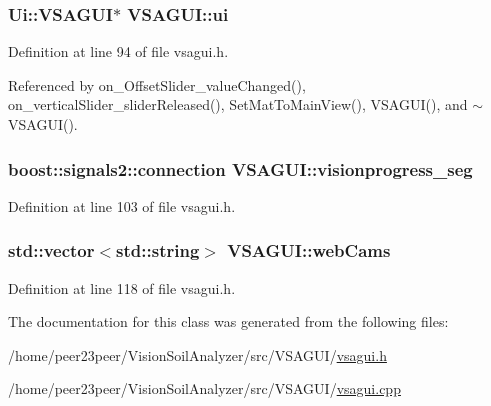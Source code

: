 \hypertarget{class_v_s_a_g_u_i_a7a1d0cb3cf813ff9dce12f7f0ed6cd7a}{}
\subsubsection[{ui}]{\setlength{\rightskip}{0pt plus 5cm}Ui\+::\+V\+S\+A\+G\+U\+I$\ast$ V\+S\+A\+G\+U\+I\+::ui\hspace{0.3cm}{\ttfamily [private]}}\label{class_v_s_a_g_u_i_a7a1d0cb3cf813ff9dce12f7f0ed6cd7a}


Definition at line 94 of file vsagui.\+h.



Referenced by on\+\_\+\+Offset\+Slider\+\_\+value\+Changed(), on\+\_\+vertical\+Slider\+\_\+slider\+Released(), Set\+Mat\+To\+Main\+View(), V\+S\+A\+G\+U\+I(), and $\sim$\+V\+S\+A\+G\+U\+I().

\hypertarget{class_v_s_a_g_u_i_a524d706a05977a319c6381aae3f313de}{}
\subsubsection[{visionprogress\+\_\+seg}]{\setlength{\rightskip}{0pt plus 5cm}boost\+::signals2\+::connection V\+S\+A\+G\+U\+I\+::visionprogress\+\_\+seg\hspace{0.3cm}{\ttfamily [private]}}\label{class_v_s_a_g_u_i_a524d706a05977a319c6381aae3f313de}


Definition at line 103 of file vsagui.\+h.

\hypertarget{class_v_s_a_g_u_i_a1177641d1293c486f77fa62e3c8ed26a}{}
\subsubsection[{web\+Cams}]{\setlength{\rightskip}{0pt plus 5cm}std\+::vector$<$std\+::string$>$ V\+S\+A\+G\+U\+I\+::web\+Cams\hspace{0.3cm}{\ttfamily [private]}}\label{class_v_s_a_g_u_i_a1177641d1293c486f77fa62e3c8ed26a}


Definition at line 118 of file vsagui.\+h.



The documentation for this class was generated from the following files\+:\begin{DoxyCompactItemize}
\item 
/home/peer23peer/\+Vision\+Soil\+Analyzer/src/\+V\+S\+A\+G\+U\+I/\hyperlink{vsagui_8h}{vsagui.\+h}\item 
/home/peer23peer/\+Vision\+Soil\+Analyzer/src/\+V\+S\+A\+G\+U\+I/\hyperlink{vsagui_8cpp}{vsagui.\+cpp}\end{DoxyCompactItemize}
